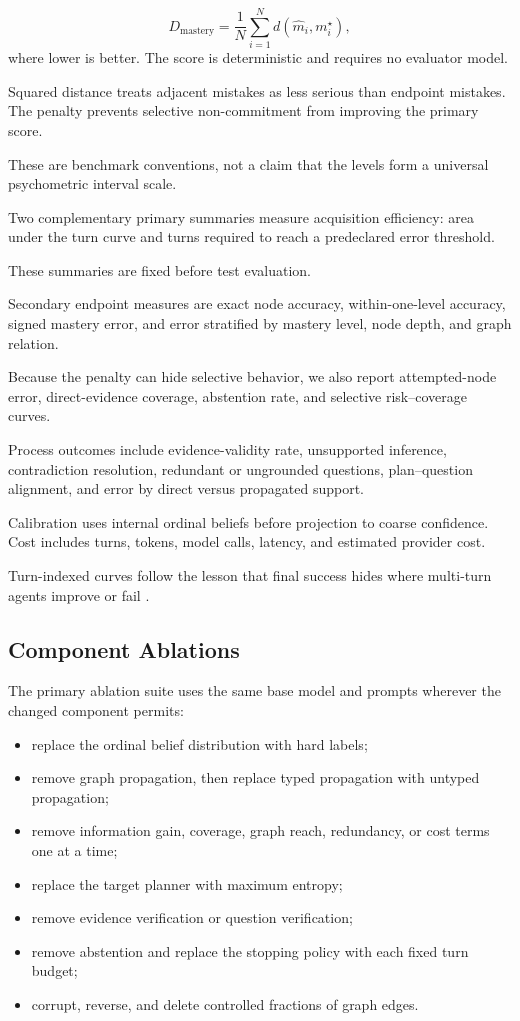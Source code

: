 \begin{equation}
    D_{\mathrm{mastery}} = \frac{1}{N}\sum_{i=1}^{N} d(\hat{m}_i,m_i^{\star}),
\end{equation}
where lower is better. The score is deterministic and requires no evaluator model.

Squared distance treats adjacent mistakes as less serious than endpoint mistakes. The \unknown penalty
prevents selective non-commitment from improving the primary score.

These are benchmark conventions, not a claim that the levels form a universal psychometric interval
scale.

Two complementary primary summaries measure acquisition efficiency: area under the turn curve and turns
required to reach a predeclared error threshold.

These summaries are fixed before test evaluation.

Secondary endpoint measures are exact node accuracy, within-one-level accuracy, signed mastery error,
and error stratified by mastery level, node depth, and graph relation.

Because the \unknown penalty can hide selective behavior, we also report attempted-node error,
direct-evidence coverage, abstention rate, and selective risk--coverage curves.

Process outcomes include evidence-validity rate, unsupported inference, contradiction resolution,
redundant or ungrounded questions, plan--question alignment, and error by direct versus propagated
support.

Calibration uses internal ordinal beliefs before projection to coarse confidence. Cost includes turns,
tokens, model calls, latency, and estimated provider cost.

Turn-indexed curves follow the lesson that final success hides where multi-turn agents improve or fail
\citep{ma2024agentboard}.

\subsection{Component Ablations}

The primary ablation suite uses the same base model and prompts wherever the changed component permits:

\begin{itemize}[leftmargin=1.5em]
    \item replace the ordinal belief distribution with hard labels;
    \item remove graph propagation, then replace typed propagation with untyped propagation;
    \item remove information gain, coverage, graph reach, redundancy, or cost terms one at a time;
    \item replace the target planner with maximum entropy;
    \item remove evidence verification or question verification;
    \item remove abstention and replace the stopping policy with each fixed turn budget;
    \item corrupt, reverse, and delete controlled fractions of graph edges.
\end{itemize}

